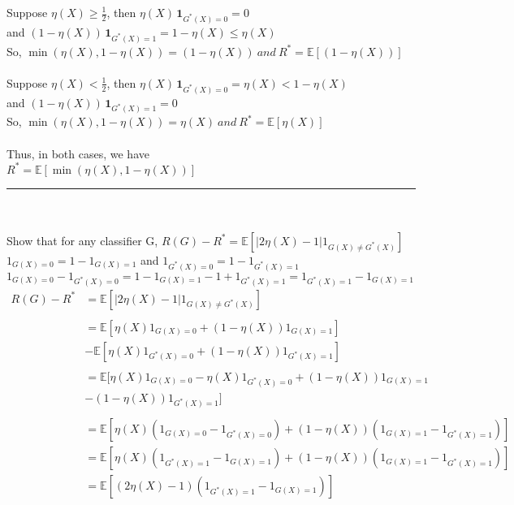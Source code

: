 \documentclass[12pt]{article}
\begin{document}
\begin{enumerate}
Suppose $\eta(X)\ge \tfrac12$, then $\eta(X)\, \mathbf{1}_{G^*(X)=0}=0$\\
and $(1-\eta(X))\, \mathbf{1}_{G^*(X)=1}=1-\eta(X)\le \eta(X)$\\
So, $\min(\eta(X), 1 - \eta(X)) = (1 - \eta(X)) \: and \: R^* = \mathbb{E}[(1 - \eta(X))]$\\\\
Suppose $\eta(X)< \tfrac12$, then $\eta(X)\, \mathbf{1}_{G^*(X)=0}=\eta(X) < 1 - \eta(X)$\\
and $(1-\eta(X))\, \mathbf{1}_{G^*(X)=1}=0$\\
So, $\min(\eta(X), 1 - \eta(X)) = \eta(X) \: and \: R^* = \mathbb{E}[\eta(X)]$\\\\
Thus, in both cases, we have \\ $R^* = \mathbb{E}[\min(\eta(X), 1 - \eta(X))]$\\
\noindent\rule{8cm}{0.4pt}\\\\
Show that for any classifier G, $R(G) - R^* = \mathbb{E}[|2\eta(X) - 1|1_{G(X) \neq G^*(X)}]$\\

$1_{G(X)= 0} = 1 - 1_{G(X)= 1}$ and $1_{G^*(X)= 0} = 1 - 1_{G^*(X)= 1}$\\
$1_{G(X)=0} - 1_{G^*(X)=0} = 1 - 1_{G(X)=1} - 1 + 1_{G^*(X)=1} = 1_{G^*(X)=1} - 1_{G(X)=1}$
\begin{align*}
R(G) - R^* &= \mathbb{E}[|2\eta(X) - 1|1_{G(X) \neq G^*(X)}]\nonumber\\\\
&= \mathbb{E}[\eta(X)1_{G(X)=0} + (1 - \eta(X))1_{G(X)=1}]\\
&- \mathbb{E}[\eta(X)1_{G^*(X)=0} + (1 - \eta(X))1_{G^*(X)=1}]\\\\
&= \mathbb{E}[\eta(X)1_{G(X)=0} - \eta(X)1_{G^*(X)=0} + (1 - \eta(X))1_{G(X)=1}\\
&- (1 - \eta(X))1_{G^*(X)=1}]\\\\
&= \mathbb{E}[\eta(X)(1_{G(X)=0} - 1_{G^*(X)=0}) + (1 - \eta(X))(1_{G(X)=1} - 1_{G^*(X)=1})]\\
&= \mathbb{E}[\eta(X)(1_{G^*(X)=1} - 1_{G(X)=1}) + (1 - \eta(X))(1_{G(X)=1} - 1_{G^*(X)=1})]\\
&= \mathbb{E}[(2\eta(X) - 1)(1_{G^*(X)=1} - 1_{G(X)=1})]\\
\end{align*}


\end{enumerate}
\end{document}
